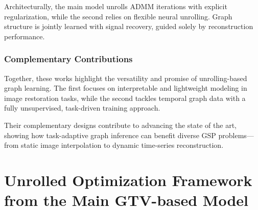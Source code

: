 \documentclass{article}
\theoremstyle{plain}
\theoremstyle{definition}
\theoremstyle{remark}
\begin{document}
Architecturally, the main model unrolls ADMM iterations with explicit regularization, while the second relies on flexible neural unrolling. Graph structure is jointly learned with signal recovery, guided solely by reconstruction performance.

\subsubsection{Complementary Contributions}

Together, these works highlight the versatility and promise of unrolling-based graph learning. The first focuses on interpretable and lightweight modeling in image restoration tasks, while the second tackles temporal graph data with a fully unsupervised, task-driven training approach. 

Their complementary designs contribute to advancing the state of the art, showing how task-adaptive graph inference can benefit diverse GSP problems—from static image interpolation to dynamic time-series reconstruction.


\newpage




\newpage
\appendix
\onecolumn
\section{Unrolled Optimization Framework from the Main GTV-based Model}
\end{document}
